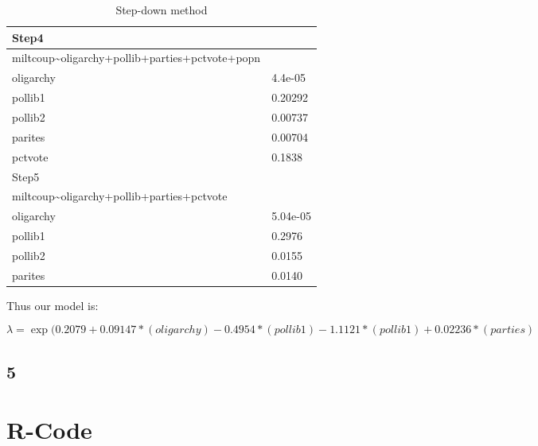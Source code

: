 \documentclass{article}
\begin{document}
\begin{table}[H]
\begin{center}
\begin{tabular}{|ll|}
        \hline
        Step4&\\
        \hline 
        miltcoup\textasciitilde oligarchy+pollib+parties+pctvote+popn\\
        oligarchy & 4.4e-05 \\
        pollib1 & 0.20292 \\
       	pollib2 & 0.00737 \\
        parites & 0.00704 \\
        pctvote & 0.1838\\
        \hline
        Step5&\\
        \hline
        miltcoup\textasciitilde oligarchy+pollib+parties+pctvote\\
        oligarchy & 5.04e-05 \\
        pollib1 & 0.2976 \\
       	pollib2 & 0.0155 \\
        parites & 0.0140 \\
        \hline
    \end{tabular}
    \caption{Step-down method}
    \label{table:step-down}
    \end{center}
    \end{table}
    
Thus our model is:

\[
\lambda = \exp(0.2079+0.09147*(oligarchy) - 0.4954*(pollib1) - 1.1121*(pollib1) + 0.02236*(parties)
\]    
    
    \subsection*{5}
    
  \section{R-Code}
\end{document}
